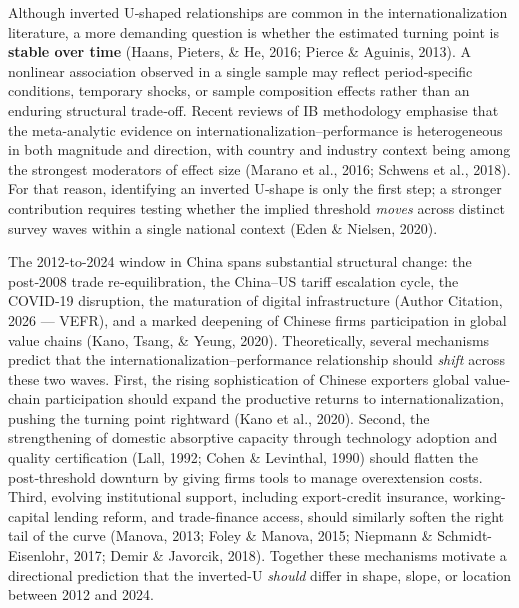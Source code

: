 \documentclass[12pt,a4paper]{article}
\begin{document}
Although inverted U‑shaped relationships are common in the
internationalization literature, a more demanding question is whether
the estimated turning point is \textbf{stable over time} (Haans,
Pieters, \& He, 2016; Pierce \& Aguinis, 2013). A nonlinear association
observed in a single sample may reflect period‑specific conditions,
temporary shocks, or sample composition effects rather than an enduring
structural trade‑off. Recent reviews of IB methodology emphasise that
the meta-analytic evidence on internationalization--performance is
heterogeneous in both magnitude and direction, with country and industry
context being among the strongest moderators of effect size (Marano et
al., 2016; Schwens et al., 2018). For that reason, identifying an
inverted U‑shape is only the first step; a stronger contribution
requires testing whether the implied threshold \emph{moves} across
distinct survey waves within a single national context (Eden \& Nielsen,
2020).

The 2012-to-2024 window in China spans substantial structural change:
the post‑2008 trade re‑equilibration, the China--US tariff escalation
cycle, the COVID‑19 disruption, the maturation of digital infrastructure
(Author Citation, 2026 --- VEFR), and a marked deepening of Chinese
firms\textquotesingle{} participation in global value chains (Kano,
Tsang, \& Yeung, 2020). Theoretically, several mechanisms predict that
the internationalization--performance relationship should \emph{shift}
across these two waves. First, the rising sophistication of Chinese
exporters\textquotesingle{} global value-chain participation should
expand the productive returns to internationalization, pushing the
turning point rightward (Kano et al., 2020). Second, the strengthening
of domestic absorptive capacity through technology adoption and quality
certification (Lall, 1992; Cohen \& Levinthal, 1990) should flatten the
post‑threshold downturn by giving firms tools to manage overextension
costs. Third, evolving institutional support, including export-credit
insurance, working-capital lending reform, and trade-finance access,
should similarly soften the right tail of the curve (Manova, 2013; Foley
\& Manova, 2015; Niepmann \& Schmidt-Eisenlohr, 2017; Demir \& Javorcik,
2018). Together these mechanisms motivate a directional prediction that
the inverted-U \emph{should} differ in shape, slope, or location between
2012 and 2024.
\end{document}
